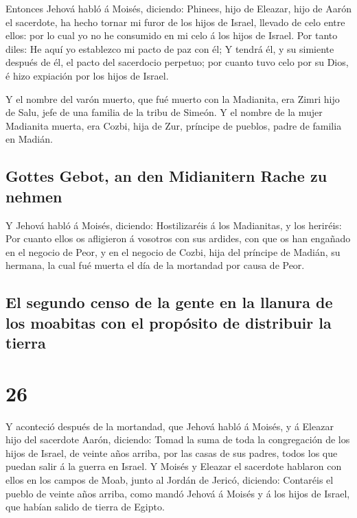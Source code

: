  Entonces Jehová habló á Moisés, diciendo: 
Phinees, hijo de Eleazar, hijo de Aarón el sacerdote, ha hecho tornar mi
furor de los hijos de Israel, llevado de celo entre ellos: por lo cual
yo no he consumido en mi celo á los hijos de Israel.  Por
tanto diles: He aquí yo establezco mi pacto de paz con él; 
Y tendrá él, y su simiente después de él, el pacto del sacerdocio
perpetuo; por cuanto tuvo celo por su Dios, é hizo expiación por los
hijos de Israel.

 Y el nombre del varón muerto, que fué muerto con la
Madianita, era Zimri hijo de Salu, jefe de una familia de la tribu de
Simeón.  Y el nombre de la mujer Madianita muerta, era
Cozbi, hija de Zur, príncipe de pueblos, padre de familia en Madián.

\hypertarget{gottes-gebot-an-den-midianitern-rache-zu-nehmen}{%
\subsection{Gottes Gebot, an den Midianitern Rache zu
nehmen}\label{gottes-gebot-an-den-midianitern-rache-zu-nehmen}}

 Y Jehová habló á Moisés, diciendo: 
Hostilizaréis á los Madianitas, y los heriréis:  Por cuanto
ellos os afligieron á vosotros con sus ardides, con que os han engañado
en el negocio de Peor, y en el negocio de Cozbi, hija del príncipe de
Madián, su hermana, la cual fué muerta el día de la mortandad por causa
de Peor.

\hypertarget{el-segundo-censo-de-la-gente-en-la-llanura-de-los-moabitas-con-el-propuxf3sito-de-distribuir-la-tierra}{%
\subsection{El segundo censo de la gente en la llanura de los moabitas
con el propósito de distribuir la
tierra}\label{el-segundo-censo-de-la-gente-en-la-llanura-de-los-moabitas-con-el-propuxf3sito-de-distribuir-la-tierra}}

\hypertarget{section-25}{%
\section{26}\label{section-25}}

 Y aconteció después de la mortandad, que Jehová habló á
Moisés, y á Eleazar hijo del sacerdote Aarón, diciendo: 
Tomad la suma de toda la congregación de los hijos de Israel, de veinte
años arriba, por las casas de sus padres, todos los que puedan salir á
la guerra en Israel.  Y Moisés y Eleazar el sacerdote
hablaron con ellos en los campos de Moab, junto al Jordán de Jericó,
diciendo:  Contaréis el pueblo de veinte años arriba, como
mandó Jehová á Moisés y á los hijos de Israel, que habían salido de
tierra de Egipto.

